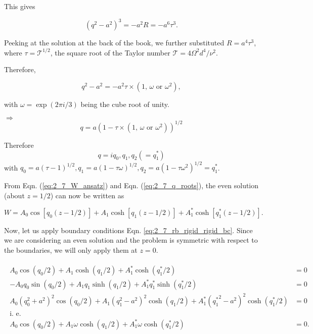 \documentclass{article}
\begin{document}
This gives

\begin{equation}\label{eq:2_7_rb_marginal_roots}
 (q^{2}-a^{2})^{3} = - a^{2} R = -a^{6} \tau^{3}.
\end{equation}

Peeking at the solution at the back of the book, we further substituted $R = a^{4}\tau^{3}$, where $\tau = \mathcal{T}^{1/2}$, the square root of the Taylor number $\mathcal{T} = 4\Omega^{2}d^{4}/\nu^{2}$. 

Therefore, 

\begin{equation}
 q^{2}-a^{2} = -a^{2}\tau \times (1 \textrm{, } \omega \textrm{ or } \omega^{2}),
\end{equation}

with $\omega = \exp{(2\pi i/3)}$ being the cube root of unity.

$\Rightarrow$
$$q = a (1- \tau \times (1 \textrm{, } \omega \textrm{ or } \omega^{2}))^{1/2} $$

Therefore
\begin{equation}\label{eq:2_7_q_roots}
 q = iq_{0}, q_{1}, q_{2} ( =  q^{*}_{1})
\end{equation}
with $q_{0} = a (\tau - 1)^{1/2}, q_{1} = a (1 - \tau \omega)^{1/2}, q_{2} = a (1 - \tau \omega^{2})^{1/2} = q^{*}_{1}$. 

From Eqn. (\ref{eq:2_7_W_ansatz}) and Eqn. (\ref{eq:2_7_q_roots}), the even solution (about $z = 1/2$) can now be written as

\begin{equation}\label{eq:2_7_even_soln}
\boxed{
 W = A_{0} \cos{[q_{0}(z-1/2)]} + A_{1} \cosh{[q_{1}(z-1/2)]} + A^{*}_{1} \cosh{[q^{*}_{1}(z-1/2)]}
 }.
\end{equation}

Now, let us apply boundary conditions Eqn. \ref{eq:2_7_rb_rigid_rigid_bc}. Since we are considering an even solution and the problem is symmetric with respect to the boundaries, we will only apply them at $z= 0$.  

\begin{align}\label{eq:2_7_apply_bc_naive}
 \begin{split}
  A_{0} \cos{(q_{0}/2)} + A_{1}\cosh{(q_{1}/2)} + A^{*}_{1}\cosh{(q^{*}_{1}/2)} & = 0 \\
  -A_{0}q_{0}\sin{(q_{0}/2)} + A_{1}q_{1}\sinh{(q_{1}/2)} + A^{*}_{1}q^{*}_{1}\sinh{(q^{*}_{1}/2)} & = 0\\
  A_{0}(q_{0}^{2} + a^{2})^{2}\cos{(q_{0}/2)} + A_{1}(q_{1}^{2} - a^{2})^{2}\cosh{(q_{1}/2)} + A^{*}_{1}({q^{*}_{1}}^{2} - a^{2})^{2}\cosh{(q^{*}_{1}/2)}  & = 0 \\
  \textrm{i. e.}\\
  A_{0}\cos{(q_{0}/2)} + A_{1}\omega \cosh{(q_{1}/2)} + A^{*}_{1}\omega \cosh{(q^{*}_{1}/2)} & = 0.
 \end{split}
\end{align}
\end{document}
